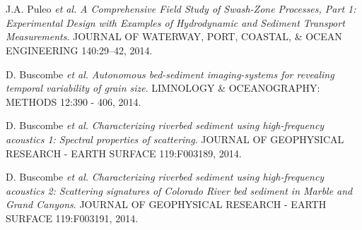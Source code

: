 \documentclass{article} %
\def\sf{\sffamily}
\def\sl{\slshape}
\newlength\sidebarwidth
\newcommand{\subtopic}[3][]
	 {\begin{minipage}{\textwidth}
	 \vspace*{.4\baselineskip}
         \nopagebreak\hspace{0in}%
         \nopagebreak\begin{minipage}[t]{\sidebarwidth - .2cm}
         \raggedleft {\sf\fontseries{sbc}\selectfont #2}
         {\\[-0.2\baselineskip] \textcolor{gray}{\footnotesize #1}}
	 \end{minipage}%
	 \hfill
	 \begin{minipage}[t]{\linewidth - \sidebarwidth}
	 #3%
	 \end{minipage}%
	 \vspace*{.2\baselineskip plus 1\baselineskip minus
	 .2\baselineskip}%
	 \end{minipage}}
\begin{document}
\subtopic{\hspace*{-3ex} 2014}{~
  \begin{itemize}[leftmargin=0ex, itemsep=0ex, parsep=.5ex, labelindent=-4ex]

    \publication
      J.A. Puleo {\sl et al.}
      {\sl A Comprehensive Field Study of Swash-Zone Processes, Part 1: Experimental Design with Examples of Hydrodynamic and Sediment Transport Measurements}.
      JOURNAL OF WATERWAY, PORT, COASTAL, \& OCEAN ENGINEERING 140:29–42, 2014.

    \publication
      D. Buscombe {\sl et al.}
      {\sl Autonomous bed-sediment imaging-systems for revealing temporal variability of grain size}.
      LIMNOLOGY \& OCEANOGRAPHY: METHODS 12:390 - 406, 2014.

    \publication
      D. Buscombe {\sl et al.}
      {\sl Characterizing riverbed sediment using high-frequency acoustics 1: Spectral properties of scattering}.
      JOURNAL OF GEOPHYSICAL RESEARCH - EARTH SURFACE 119:F003189, 2014.

    \publication
      D. Buscombe {\sl et al.}
      {\sl Characterizing riverbed sediment using high-frequency acoustics 2: Scattering signatures of Colorado River bed sediment in Marble and Grand Canyons}.
      JOURNAL OF GEOPHYSICAL RESEARCH - EARTH SURFACE 119:F003191, 2014.

    \end{itemize}
}
\end{document}
